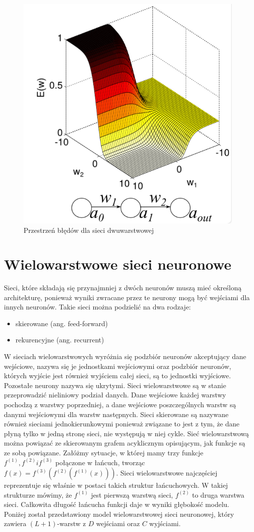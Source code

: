 \begin{figure}[H]
	\centering
	\includegraphics[width=0.4\linewidth]{2layererror}
	\caption{Przestrzeń błędów dla sieci dwuwarstwowej}
	\label{fig:2layererror}
\end{figure}



\section{Wielowarstwowe sieci neuronowe}

Sieci, które składają się przynajmniej z dwóch neuronów muszą mieć określoną architekturę, ponieważ wyniki zwracane przez te neurony mogą być wejściami dla innych neuronów. Takie sieci można podzielić na dwa rodzaje:
\begin{itemize}
	\item skierowane (ang. feed-forward)
	\item rekurencyjne (ang. recurrent)
\end{itemize}

W sieciach wielowarstwowych wyróżnia się podzbiór neuronów akceptujący dane wejściowe, nazywa się je jednostkami wejściowymi oraz podzbiór neuronów, których wyjście jest również wyjściem całej sieci, są to jednostki wyjściowe. Pozostałe neurony nazywa się ukrytymi. Sieci wielowarstwowe są w stanie przeprowadzić nieliniowy podział danych. Dane wejściowe każdej warstwy pochodzą z warstwy poprzedniej, a dane wejściowe poszczególnych warstw są danymi wejściowymi dla warstw następnych. Sieci skierowane są nazywane również sieciami jednokierunkowymi ponieważ związane to jest z tym, że dane płyną tylko w jedną stronę sieci, nie występują w niej cykle. Sieć wielowarstwową można powiązać ze skierowanym grafem acyklicznym opisującym, jak funkcje są ze sobą powiązane. Załóżmy sytuacje, w której mamy trzy funkcje $f^{(1)}, f^{(2)} i f^{(3)}$ połączone w łańcuch, tworząc $f(x) = f^{(3)} (f^{(2)} ( f^{(1)} (x)))$. Sieci wielowarstwowe najczęściej reprezentuje się właśnie w postaci takich struktur łańcuchowych. W takiej strukturze mówimy, że $f^{(1)}$ jest pierwszą warstwą sieci, $f^{(2)}$ to druga warstwa sieci. Całkowita długość łańcucha funkcji daje w wyniki głębokość modelu. Poniżej został przedstawiony model wielowarstwowej sieci neuronowej, który zawiera $(L+1)$-warstw z $D$ wejściami oraz $C$ wyjściami.


